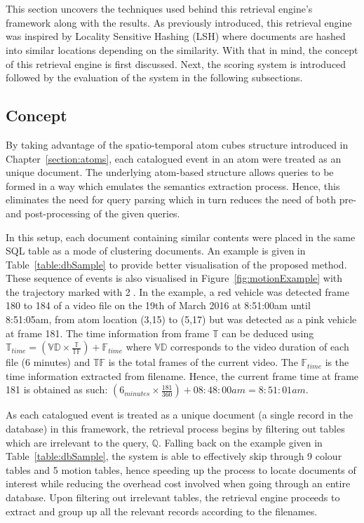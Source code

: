 \section{\versionOneRet}
\label{section:versionOne}
This section uncovers the techniques used behind this retrieval engine's framework along with the results. As previously introduced, this retrieval engine was inspired by Locality Sensitive Hashing (LSH) where documents are hashed into similar locations depending on the similarity. With that in mind,  the concept of this retrieval engine is first discussed. Next, the scoring system is introduced followed by the evaluation of the system in the following subsections.

\subsection{Concept}
\label{versionOneConcept}
By taking advantage of the spatio-temporal atom cubes structure introduced in Chapter~\ref{section:atoms}, each catalogued event in an atom were treated as an unique document. The underlying atom-based structure allows queries to be formed in a way which emulates the semantics extraction process. Hence, this eliminates the need for query parsing which in turn reduces the need of both pre- and post-processing of the given queries.

In this setup, each document containing similar contents were placed in the same SQL table as a mode of clustering documents. An example is given in Table~\ref{table:dbSample} to provide better visualisation of the proposed method. These sequence of events is also visualised in Figure~\ref{fig:motionExample} with the trajectory marked with \textcircled{2}.
In the example, a red vehicle was detected frame 180 to 184 of a video file on the 19th of March 2016 at 8:51:00am until 8:51:05am, from atom location (3,15) to (5,17) but was detected as a pink vehicle at frame 181.
The time information from frame $\mathbb{T}$ can be deduced using $\mathbb{T}_{time}  = (\mathbb{VD} \times \frac{\mathbb{T}}{\mathbb{TF}}) + \mathbb{F}_{time}$ where $\mathbb{VD}$ corresponds to the video duration of each file (6 minutes) and $\mathbb{TF}$ is the total frames of the current video. The $\mathbb{F}_{time}$ is the time information extracted from filename.
Hence, the current frame time at frame 181 is obtained as such: $(6_{minutes} \times \frac{181}{360}) + 08:48:00am = 8:51:01am$.

As each catalogued event is treated as a unique document (a single record in the database) in this framework, the retrieval process begins by filtering out tables which are irrelevant to the query, $\mathbb{Q}$. Falling back on the example given in Table~\ref{table:dbSample}, the system is able to effectively skip through 9 colour tables and 5 motion tables, hence speeding up the process to locate documents of interest while reducing the overhead cost involved when going through an entire database. Upon filtering out irrelevant tables, the retrieval engine proceeds to extract and group up all the relevant records according to the filenames.

